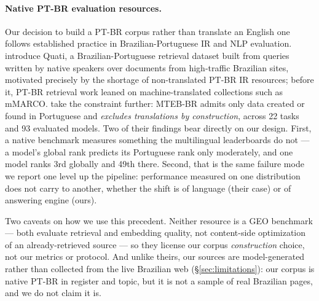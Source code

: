 \documentclass[11pt,a4paper]{article}
\begin{document}
\paragraph{Native PT-BR evaluation resources.} Our decision to build a
PT-BR corpus rather than translate an English one follows established
practice in Brazilian-Portuguese IR and NLP evaluation.
\citet{bueno2024quati} introduce Quati, a Brazilian-Portuguese retrieval
dataset built from queries written by native speakers over documents from
high-traffic Brazilian sites, motivated precisely by the shortage of
non-translated PT-BR IR resources; before it, PT-BR retrieval work leaned
on machine-translated collections such as mMARCO.
\citet{mtebbr2026} take the constraint further: MTEB-BR admits only data
created or found in Portuguese and \emph{excludes translations by
construction}, across 22 tasks and 93 evaluated models. Two of their
findings bear directly on our design. First, a native benchmark measures
something the multilingual leaderboards do not --- a model's global rank
predicts its Portuguese rank only moderately, and one model ranks 3rd
globally and 49th there. Second, that is the same failure mode we report
one level up the pipeline: performance measured on one distribution does
not carry to another, whether the shift is of language (their case) or of
answering engine (ours).

Two caveats on how we use this precedent. Neither resource is a GEO
benchmark --- both evaluate retrieval and embedding quality, not
content-side optimization of an already-retrieved source --- so they
license our corpus \emph{construction} choice, not our metrics or protocol.
And unlike theirs, our sources are model-generated rather than collected
from the live Brazilian web (\S\ref{sec:limitations}): our corpus is native
PT-BR in register and topic, but it is not a sample of real Brazilian
pages, and we do not claim it is.

\end{document}
